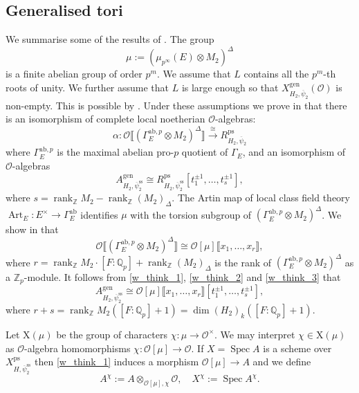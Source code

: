 \documentclass{amsart}
\theoremstyle{definition}
\theoremstyle{remark}
\def\rank{\mathop{\mathrm{ rank}}\nolimits}
\DeclareMathOperator{\Spec}{Spec}
\DeclareMathOperator{\Art}{Art}
\newcommand{\Qp}{\mathbb {Q}_p}
\newcommand{\Zp}{\mathbb{Z}_p}
\newcommand{\ZZ}{\mathbb Z}
\newcommand{\ab}{\mathrm{ab}}
\newcommand{\OO}{\mathcal O}
\newcommand{\br}[1]{\llbracket #1\rrbracket}
\newcommand{\ps}{\mathrm{ps}}
\newcommand{\gen}{\mathrm{gen}}
\newcommand{\psibar}{\overline{\psi}}
\newcommand{\Xc}{\mathrm{X}}
\newcommand{\psibarss}{\psibar^{\mathrm {ss}}}
\begin{document}
\subsection{Generalised tori}\label{sec_gen_tori} We summarise some of the results of \cite{defT}. The group 
$$\mu:=(\mu_{p^{\infty}}(E)\otimes M_2)^{\Delta}$$
is a finite abelian group 
of order $p^m$. We assume that $L$ contains all the $p^m$-th roots of unity. 
We further assume that $L$ is large enough so that $X^{\gen}_{H_2, \psibar_2}(\OO)$
is non-empty. This is possible by \cite[Theorem 9.3]{defT}. 
Under these assumptions  we prove in \cite[Theorem 9.3]{defT} that there is an isomorphism of complete local noetherian $\OO$-algebras:
\begin{equation}\label{w_think_1}
\alpha: \OO\br{(\Gamma_E^{\ab,p}\otimes M_2)^{\Delta}}
\overset{\cong}{\longrightarrow}
R^{\ps}_{H_2, \psibar_2}
\end{equation}
where $\Gamma_E^{\ab,p}$ is the maximal abelian pro-$p$ quotient of $\Gamma_E$, and an isomorphism of $\OO$-algebras
\begin{equation}\label{w_think_2}
A^{\gen}_{H_2, \psibarss_2} \cong R^{\ps}_{H_2, \psibarss_2}[t_1^{\pm{1}}, \ldots, t_s^{\pm{1}}],
\end{equation}
where $s= \rank_{\ZZ} M_2 - \rank_{\ZZ} (M_2)_{\Delta}$. The Artin map of local 
class field theory $\Art_E: E^{\times} \rightarrow \Gamma_E^{\ab}$ identifies
$\mu$ with the torsion subgroup of $(\Gamma_E^{\ab,p}\otimes M_2)^{\Delta}$. We 
show in \cite[Corollary 8.8]{defT}
that
\begin{equation}\label{w_think_3}
\OO\br{(\Gamma_E^{\ab,p}\otimes M_2)^{\Delta}}\cong \OO[\mu]\br{x_1, \ldots, x_r},
\end{equation}
where $r= \rank_{\ZZ} M_2 \cdot [F:\Qp]+ \rank_{\ZZ} (M_2)_{\Delta}$ is the rank 
of $(\Gamma_E^{\ab,p}\otimes M_2)^{\Delta}$ as a $\Zp$-module. 
It follows from \eqref{w_think_1}, \eqref{w_think_2} and \eqref{w_think_3} that 
\begin{equation}\label{w_think_4}
A^{\gen}_{H_2, \psibarss_2}\cong \OO[\mu]\br{x_1,\ldots, x_r}[t_1^{\pm 1}, \ldots, t_s^{\pm 1}],
\end{equation}
where $r+s = \rank_{\ZZ} M_2 ([F:\Qp] +1)=\dim (H_2)_k ([F:\Qp]+1)$.

Let $\Xc(\mu)$ be the group of characters $\chi:\mu\rightarrow \OO^{\times}$. 
We may interpret $\chi\in \Xc(\mu)$ as $\OO$-algebra homomorphisms 
$\chi: \OO[\mu]\rightarrow \OO$. If $X=\Spec A$ is a scheme over 
$X^{\ps}_{H, \psibarss_2}$ then \eqref{w_think_1} induces a morphism 
$\OO[\mu]\rightarrow A$ and we define
\begin{equation}\label{notation_chi}
A^{\chi}:= A\otimes_{ \OO[\mu], \chi} \OO, \quad X^{\chi}:= \Spec A^{\chi}.
\end{equation}
\end{document}
